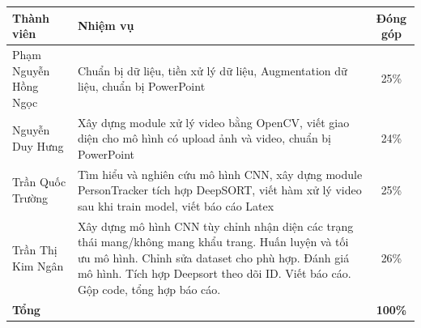\documentclass[a4paper,12pt]{article}
\begin{document}
\vspace{1cm}

\fontsize{12pt}{16pt}\selectfont
\setlength{\parindent}{0cm}

\begin{table}[H]
\centering
\renewcommand{\arraystretch}{1.5}
\begin{tabularx}{\textwidth}{|l|X|c|}
\hline
\textbf{Thành viên} & \textbf{Nhiệm vụ} & \textbf{Đóng góp} \\
\hline
Phạm Nguyễn Hồng Ngọc & Chuẩn bị dữ liệu, tiền xử lý dữ liệu, Augmentation dữ liệu, chuẩn bị PowerPoint & 25\% \\
\hline
Nguyễn Duy Hưng & Xây dựng module xử lý video bằng OpenCV, viết giao diện cho mô hình có upload ảnh và video, chuẩn bị PowerPoint & 24\% \\
\hline
Trần Quốc Trường & Tìm hiểu và nghiên cứu mô hình CNN, xây dựng module PersonTracker tích hợp DeepSORT, viết hàm xử lý video sau khi train model, viết báo cáo Latex & 25\% \\
\hline
Trần Thị Kim Ngân & Xây dựng mô hình CNN tùy chỉnh nhận diện các trạng thái mang/không mang khẩu trang. Huấn luyện và tối ưu mô hình. Chỉnh sửa dataset cho phù hợp. Đánh giá mô hình. Tích hợp Deepsort theo dõi ID. Viết báo cáo. Gộp code, tổng hợp báo cáo. & 26\% \\
\hline
\hline
\textbf{Tổng} & & \textbf{100\%} \\
\hline
\end{tabularx}
\end{table}

\newpage

\renewcommand{\contentsname}{\begin{center}\Large\textbf{MỤC LỤC}\end{center}}
\vspace{1cm}
\tableofcontents

\newpage
{}
\renewcommand{\listtablename}{\begin{center}\Large\textbf{DANH MỤC BẢNG BIỂU}\end{center}}
\vspace{1cm}
\listoftables

\newpage
{}
\renewcommand{\listfigurename}{\begin{center}\Large\textbf{DANH MỤC HÌNH ẢNH}\end{center}}
\vspace{1cm}
\listoffigures
\end{document}

